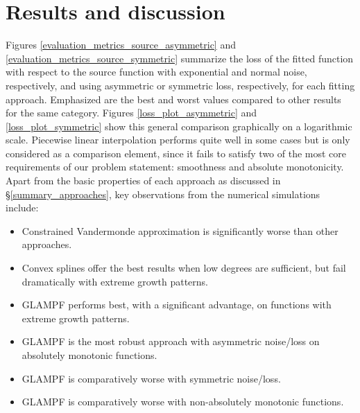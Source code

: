 \documentclass[12pt,a4paper]{article}
\begin{document}
\section{Results and discussion}
\label{results}

Figures \ref{evaluation_metrics_source_asymmetric} and \ref{evaluation_metrics_source_symmetric} summarize the loss of the fitted function with respect to the source function with exponential and normal noise, respectively, and using asymmetric or symmetric loss, respectively, for each fitting approach. Emphasized are the best and worst values compared to other results for the same category. Figures \ref{loss_plot_asymmetric} and \ref{loss_plot_symmetric} show this general comparison graphically on a logarithmic scale. Piecewise linear interpolation performs quite well in some cases but is only considered as a comparison element, since it fails to satisfy two of the most core requirements of our problem statement: smoothness and absolute monotonicity.\\

Apart from the basic properties of each approach as discussed in \S \ref{summary_approaches}, key observations from the numerical simulations include:

\begin{itemize}
\item Constrained Vandermonde approximation is significantly worse than other approaches.
\item Convex splines offer the best results when low degrees are sufficient, but fail dramatically with extreme growth patterns.
\item GLAMPF performs best, with a significant advantage, on functions with extreme growth patterns.
\item GLAMPF is the most robust approach with asymmetric noise/loss on absolutely monotonic functions.
\item GLAMPF is comparatively worse with symmetric noise/loss.
\item GLAMPF is comparatively worse with non-absolutely monotonic functions.
\end{itemize}
\end{document}
